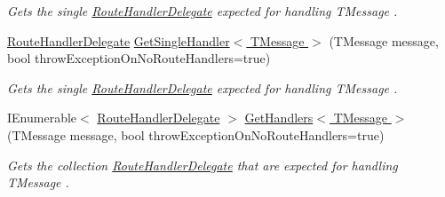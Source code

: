 \begin{DoxyCompactItemize}
\begin{DoxyCompactList}\small\item\em Gets the single \hyperlink{classCqrs_1_1Bus_1_1RouteHandlerDelegate}{Route\+Handler\+Delegate} expected for handling {\itshape T\+Message} . \end{DoxyCompactList}\item 
\hyperlink{classCqrs_1_1Bus_1_1RouteHandlerDelegate}{Route\+Handler\+Delegate} \hyperlink{classCqrs_1_1Bus_1_1RouteManager_aa681cc48828440452f6984f198369e69_aa681cc48828440452f6984f198369e69}{Get\+Single\+Handler$<$ T\+Message $>$} (T\+Message message, bool throw\+Exception\+On\+No\+Route\+Handlers=true)
\begin{DoxyCompactList}\small\item\em Gets the single \hyperlink{classCqrs_1_1Bus_1_1RouteHandlerDelegate}{Route\+Handler\+Delegate} expected for handling {\itshape T\+Message} . \end{DoxyCompactList}\item 
I\+Enumerable$<$ \hyperlink{classCqrs_1_1Bus_1_1RouteHandlerDelegate}{Route\+Handler\+Delegate} $>$ \hyperlink{classCqrs_1_1Bus_1_1RouteManager_a738be20bb4ad702f7689e2aad70a9dc5_a738be20bb4ad702f7689e2aad70a9dc5}{Get\+Handlers$<$ T\+Message $>$} (T\+Message message, bool throw\+Exception\+On\+No\+Route\+Handlers=true)
\begin{DoxyCompactList}\small\item\em Gets the collection \hyperlink{classCqrs_1_1Bus_1_1RouteHandlerDelegate}{Route\+Handler\+Delegate} that are expected for handling {\itshape T\+Message} . \end{DoxyCompactList}\end{DoxyCompactItemize}

